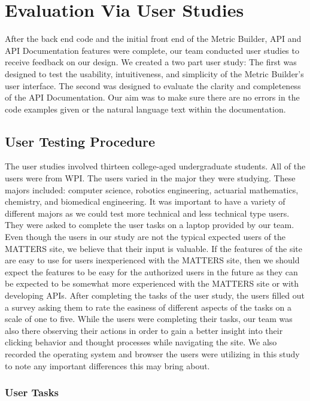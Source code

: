 \chapter{Evaluation Via User Studies}

	After the back end code and the initial front end of the Metric Builder, 
	API and API Documentation features were complete, our team conducted user studies to receive feedback on our design. We created a two part 
	user study: The first was designed to test the usability, intuitiveness, and simplicity of the 
	Metric Builder's user interface. The second was designed to evaluate the clarity and completeness 
	of the API Documentation. Our aim was to make sure there are no errors in the code examples given 
	or the natural language text within the documentation. 

	\section{User Testing Procedure}

		The user studies involved thirteen college-aged undergraduate students. All of the users were from WPI. The users varied in the major they were studying. These majors included: computer science, robotics engineering, actuarial mathematics, chemistry, and biomedical engineering. It was important to have a variety of different majors as we could test more technical and less technical type users. They were asked to complete the user tasks on a 
		laptop provided by our team. Even though the users in our study are not the typical 
		expected users of the MATTERS site, we believe that their input is valuable. 
		If the features of the site are easy to use for users inexperienced with the MATTERS site, 
		then we should expect the features to be easy for the authorized users in the future as they 
		can be expected to be somewhat more experienced with the MATTERS site or with developing APIs. After completing the tasks 
		of the user study, the users filled out a survey asking them to rate the 
		easiness of different aspects of the tasks on a scale of one to five. While the users were 
		completing their tasks, our team was also there observing their actions in order to gain a better 
		insight into their clicking behavior and thought processes while navigating the site. 
		We also recorded the operating system and browser the users were utilizing in this study to 
		note any important differences this may bring about.

		\subsection{User Tasks} 
		
